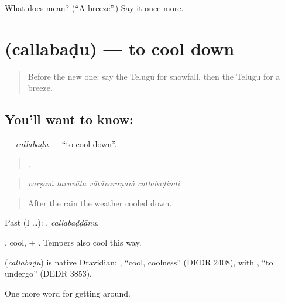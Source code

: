 \begin{tcolorbox}[breakable,colback=teal!4,colframe=teal!35!black,title={Before you move on}]
What does  mean? (\textquotedblleft{}A breeze\textquotedblright{}.) Say it once more.
\end{tcolorbox}
\section[\texorpdfstring{\te{చల్లబడు} (callabaḍu)}{చల్లబడు (callabaḍu)}]{ (callabaḍu) — to cool down}

\label{lesson:TE-C482-callabadu}



\begin{quote}
Before the new one: say the Telugu for snowfall, then the Telugu for a breeze.
\end{quote}

\subsection*{You'll want to know: }
\textbf{} — \emph{callabaḍu} — \textquotedblleft{}to cool down\textquotedblright{}.

\begin{quote}
   .
\end{quote}

\begin{quote}
\emph{varṣaṁ taruvāta vātāvaraṇaṁ callabaḍindi.}
\end{quote}

\begin{quote}
After the rain the weather cooled down.
\end{quote}

Past (I …): , \emph{callabaḍḍānu}.

, cool, + . Tempers also cool this way.

\begin{cousinweb}
\textbf{} (\emph{callabaḍu}) is native Dravidian: , \textquotedblleft{}cool, coolness\textquotedblright{} (DEDR 2408), with , \textquotedblleft{}to undergo\textquotedblright{} (DEDR 3853).
\end{cousinweb}

\begin{grammarlens}[title={What you've built}]
One more word for getting around.
\end{grammarlens}

